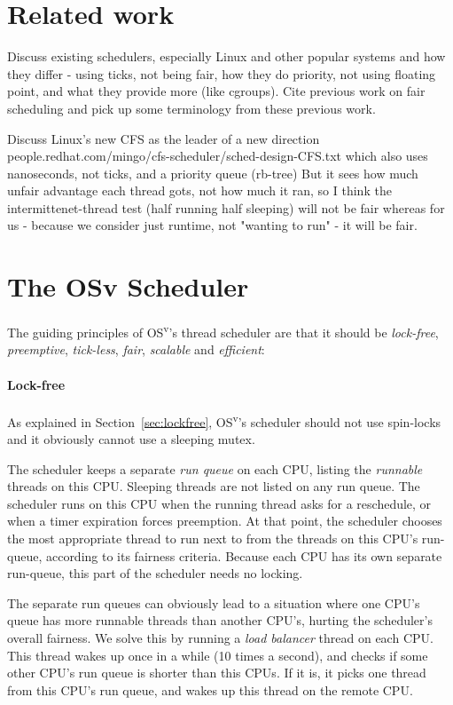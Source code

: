 \documentclass{sig-alternate}
\begin{document}
\section{Related work}
Discuss existing schedulers, especially Linux and other popular systems
and how they differ - using ticks, not being fair, how they do priority,
not using floating point, and what they provide more (like cgroups).
Cite previous work on fair scheduling and pick up some terminology from
these previous work.

Discuss Linux's new CFS as the leader of a new direction
people.redhat.com/mingo/cfs-scheduler/sched-design-CFS.txt
which also uses nanoseconds, not ticks, and a priority queue (rb-tree)
But it sees how much unfair advantage each thread gots, not how much it ran,
so I think the intermittenet-thread test (half running half sleeping) will
not be fair whereas for us - because we consider just runtime, not "wanting
to run" - it will be fair.

\section{The OSv Scheduler}
\label{sec:sched}
The guiding principles of OS\textsuperscript{v}'s thread scheduler are that it should be
\emph{lock-free}, \emph{preemptive}, \emph{tick-less}, \emph{fair},
\emph{scalable} and \emph{efficient}:

\paragraph{Lock-free}
As explained in Section~\ref{sec:lockfree}, OS\textsuperscript{v}'s scheduler should not use spin-locks
and it obviously cannot use a sleeping mutex.

The scheduler keeps a separate \emph{run queue} on each CPU, listing the
\emph{runnable} threads on this CPU. Sleeping
threads are not listed on any run queue. The scheduler runs on this
CPU when the running thread asks for a reschedule, or when a timer expiration 
forces preemption. At that point, the scheduler chooses the most appropriate
thread to run next to from the threads
on this CPU's run-queue, according to its fairness criteria.
Because each CPU has its own separate run-queue, this part of the scheduler
needs no locking.

The separate run queues can obviously lead to a situation where one CPU's
queue has more runnable threads than another CPU's, hurting the scheduler's
overall fairness. We solve this by running a \emph{load balancer} thread on each
CPU. This thread wakes up once in a while (10 times a second), and checks
if some other CPU's run queue is shorter than this CPUs. If it is, it picks
one thread from this CPU's run queue, and wakes up this thread on the
remote CPU.
\end{document}
